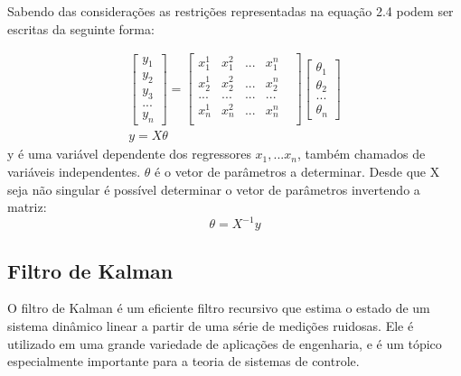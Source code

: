 Sabendo das considerações as restrições representadas na equação 2.4 podem ser escritas da seguinte forma:

\begin{equation}
\begin{array}{c}
\begin{bmatrix}
y_1 \\ y_2 \\ y_3\\ ... \\ y_n
\end{bmatrix}
=
\begin{bmatrix}
x^1_1 & x^2_1 & ... & x^n_1\\
x^1_2 & x^2_2 & ... & x^n_2\\
... & ... & ...& ...&\\
x^1_n & x^2_n & ... & x^n_n\\
\end{bmatrix}
\begin{bmatrix}
\theta_1 \\ \theta_2 \\ ... \\ \theta_n
\end{bmatrix}
\\
y=X \theta
\end{array}
\end{equation}
y é uma variável dependente  dos regressores $x_1,... x_n$, também chamados de variáveis independentes. $\theta$ é o vetor de parâmetros a determinar. Desde que X seja não singular é possível determinar o vetor de parâmetros invertendo a matriz:
\begin{equation}
\theta=X^{-1}y
\end{equation}


\subsection {Filtro de Kalman}
O filtro de Kalman é um eficiente filtro recursivo que estima o estado de um sistema dinâmico linear a partir de uma série de medições ruidosas. Ele é utilizado em uma grande variedade de aplicações de engenharia, e é um tópico especialmente importante para a teoria de sistemas de controle.
